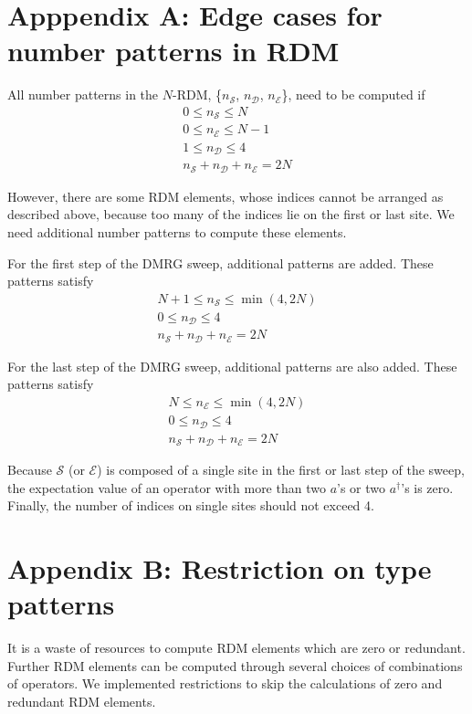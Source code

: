 \section*{Apppendix A: Edge cases for number patterns in RDM}
All number patterns in the $N$-RDM, \{$n_\mathcal{S}$, $n_\mathcal{D}$, $n_\mathcal{E}$\}, need to be computed if 
\begin{align}
0\le n_\mathcal{S} \le N \\
0\le n_\mathcal{E} \le N-1 \\
1\le n_\mathcal{D} \le 4 \\
n_\mathcal{S} +n_\mathcal{D} +n_\mathcal{E} =2N
\end{align}

However, there are some RDM elements, whose indices cannot be arranged as described above, because too many of the indices lie on the
first or last site. We need additional number patterns to compute these elements.

For the first step of the DMRG sweep, additional patterns are added. These patterns satisfy
\begin{align}
N+1\le n_\mathcal{S} \le \min(4,2N) \\
0\le n_\mathcal{D} \le 4 \\
n_\mathcal{S} +n_\mathcal{D} +n_\mathcal{E} =2N 
\end{align}

For the last step of the DMRG sweep, additional patterns are also added. These patterns satisfy
\begin{align}
N\le n_\mathcal{E} \le \min(4,2N) \\
0\le n_\mathcal{D} \le 4 \\
n_\mathcal{S} +n_\mathcal{D} +n_\mathcal{E} =2N
\end{align}

Because $\mathcal{S}$ (or $\mathcal{E}$) is composed of a single site in the first or last step of the sweep, the
expectation value of an operator with more than two $a$'s or two $a^\dagger$'s is zero. Finally, the number of indices on single sites should not exceed 4.

\section*{Appendix B: Restriction on type patterns}
It is a waste of resources to compute RDM elements which are zero or redundant. Further RDM elements can be computed through
several choices of combinations of operators. We implemented restrictions to skip the calculations of zero and redundant RDM elements.

